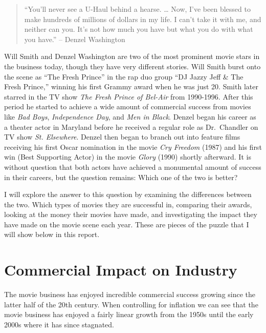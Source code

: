 \documentclass[]{article}
\begin{document}
\begin{quote}
“You’ll never see a U-Haul behind a hearse. … Now, I’ve been blessed to make hundreds of millions of dollars in my life. I can’t take it with me, and neither can you. It’s not how much you have but what you do with what you have.” – Denzel Washington
\end{quote}

Will Smith and Denzel Washington are two of the most prominent movie
stars in the business today, though they have very different stories.
Will Smith burst onto the scene as ``The Fresh Prince'' in the rap duo
group ``DJ Jazzy Jeff \& The Fresh Prince,'' winning his first Grammy
award when he was just 20. Smith later starred in the TV show
\emph{The Fresh Prince of Bel-Air} from 1990-1996. After this period he
started to achieve a wide amount of commercial success from movies like
\emph{Bad Boys}, \emph{Independence Day}, and \emph{Men in Black}.
Denzel began his career as a theater actor in Maryland before he
received a regular role as Dr.~Chandler on TV show \emph{St. Elsewhere}.
Denzel then began to branch out into feature films receiving his first
Oscar nomination in the movie \emph{Cry Freedom} (1987) and his first
win (Best Supporting Actor) in the movie \emph{Glory} (1990) shortly
afterward. It is without question that both actors have achieved a
monumental amount of success in their careers, but the question remains:
Which one of the two is better?

I will explore the answer to this question by examining the differences
between the two. Which types of movies they are successful in, comparing
their awards, looking at the money their movies have made, and
investigating the impact they have made on the movie scene each year.
These are pieces of the puzzle that I will show below in this report.

\newpage
\section{Commercial Impact on Industry}

The movie business has enjoyed incredible commercial success growing
since the latter half of the 20th century. When controlling for
inflation we can see that the movie business has enjoyed a fairly linear
growth from the 1950s until the early 2000s where it has since
stagnated.
\end{document}
